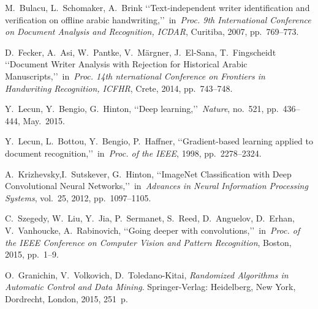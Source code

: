 \documentclass[conference,a4paper,twocolumn]{IEEEtran}
\begin{document}
\begin{thebibliography}{99}

 M.~Bulacu, L.~Schomaker, A.~Brink \lq\lq Text-independent writer identification and verification on offline arabic handwriting,\rq\rq~in~\emph{Proc. 9th International Conference on Document Analysis and Recognition, ICDAR}, Curitiba, 2007, pp.~769--773.

 D.~Fecker, A.~Asi, W.~Pantke, V.~Märgner, J.~El-Sana, T.~Fingscheidt \lq\lq Document Writer Analysis with Rejection for Historical Arabic Manuscripts,\rq\rq~in~\emph{Proc. 14th nternational Conference on Frontiers in Handwriting Recognition, ICFHR}, Crete, 2014, pp.~743--748.

 Y.~Lecun, Y.~Bengio, G.~Hinton, \lq\lq Deep learning,\rq\rq~\emph{Nature}, no.~521, pp.~436--444, May.~2015.

 Y.~Lecun, L.~Bottou, Y.~Bengio, P.~Haffner, \lq\lq Gradient-based learning applied to document recognition,\rq\rq~in~\emph{Proc. of the IEEE}, 1998, pp.~2278--2324.

 A.~Krizhevsky,I.~Sutskever, G.~Hinton, \lq\lq ImageNet Classification with Deep Convolutional Neural Networks,\rq\rq~in~\emph{Advances in Neural Information Processing Systems}, vol.~25, 2012, pp.~1097--1105.

 C.~Szegedy, W.~Liu, Y.~Jia, P.~Sermanet, S.~Reed, D.~Anguelov, D.~Erhan, V.~Vanhoucke, A.~Rabinovich, \lq\lq Going deeper with convolutions,\rq\rq~in~\emph{Proc. of the IEEE Conference on Computer Vision and Pattern Recognition}, Boston, 2015, pp.~1--9.

 O.~Granichin, V.~Volkovich, D.~Toledano-Kitai, \emph{Randomized Algorithms in Automatic Control and Data Mining}.	Springer-Verlag: Heidelberg, New York, Dordrecht, London, 2015, 251~p.

\end{thebibliography}


\end{document}
